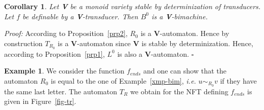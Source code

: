 \documentclass[12pt]{report}
\newtheorem{cor}{Corollary}[section]
\theoremstyle{definition}
\newtheorem{xmp}{Example}[section]
\theoremstyle{remark}
\newenvironment{prf}
{\textit{Proof:}}
{\hfill $\square$\\}
\begin{document}
\begin{cor}
\label{cor1}
Let \textbf V be a monoid variety stable by determinization of transducers.
Let $f$ be definable by a \textbf V-transducer.
Then $B^0$ is a \textbf V-bimachine.
\end{cor}
\begin{prf}
According to Proposition~\ref{prp2}, $R_0$ is a \textbf V-automaton.
Hence by construction $T_{R_0}$ is a \textbf V-automaton since \textbf V is stable by determinization.
Hence, according to Proposition~\ref{prp1}, $L^0$ is also a \textbf V-automaton.
\end{prf}

\begin{xmp}
We consider the function $f_{ends}$ and one can show that the automaton $R_0$ is equal to the one of Example~\ref{xmp-bim}, \emph{i.e.} $u\sim_{R_0} v$ if they have the same last letter.
The automaton $T_R$ we obtain for the NFT defining $f_{ends}$ is given in Figure~\ref{fig-tr}.

\begin{figure}[t]
\centering
{}
\end{figure}
\end{xmp}
\end{document}
